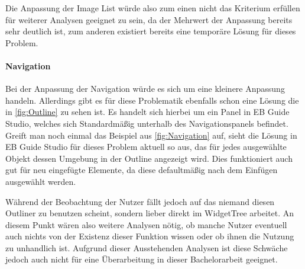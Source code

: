 Die Anpassung der Image List würde also zum einen nicht das Kriterium erfüllen für weiterer Analysen geeignet zu sein, da der Mehrwert der Anpassung bereits sehr deutlich ist, zum anderen existiert bereits eine temporäre Lösung für dieses Problem.

\paragraph{Navigation}
Bei der Anpassung der Navigation würde es sich um eine kleinere Anpassung handeln.
Allerdings gibt es für diese Problematik ebenfalls schon eine Lösung die in \cref{fig:Outline} zu sehen ist.
Es handelt sich hierbei um ein Panel in EB Guide Studio, welches sich Standardmäßig unterhalb des Navigationspanels befindet.
Greift man noch einmal das Beispiel aus \cref{fig:Navigation} auf, sieht die Lösung in EB Guide Studio für dieses Problem aktuell so aus, das für jedes ausgewählte Objekt dessen Umgebung in der Outline angezeigt wird.
Dies funktioniert auch gut für neu eingefügte Elemente, da diese defaultmäßig nach dem Einfügen ausgewählt werden.

Während der Beobachtung der Nutzer fällt jedoch auf das niemand diesen Outliner zu benutzen scheint, sondern lieber direkt im WidgetTree arbeitet.
An diesem Punkt wären also weitere Analysen nötig, ob manche Nutzer eventuell auch nichts von der Existenz dieser Funktion wissen oder ob ihnen die Nutzung zu unhandlich ist.
Aufgrund dieser Ausstehenden Analysen ist diese Schwäche jedoch auch nicht für eine Überarbeitung in dieser Bachelorarbeit geeignet.


